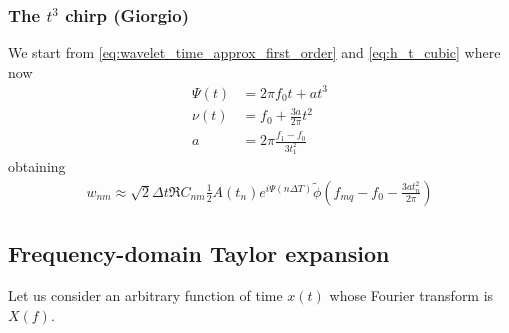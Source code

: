 \documentclass{article}
\begin{document}
\subsubsection{The $t^3$ chirp (Giorgio)}
We start from \eqref{eq:wavelet_time_approx_first_order} and \eqref{eq:h_t_cubic} where now
%
\begin{align}
    \Psi(t) &= 2 \pi f_0 t + a t^{3}\nonumber\\
    \nu(t) &= f_0 + \frac{3 a}{2\pi} t^2\nonumber\\
    a&=2\pi \frac{f_1-f_0}{3t_1^2}
\end{align}
%
obtaining
%
\begin{align}
\label{eq:wavelet_time_approx_first_order_tcube}
w_{n m} \approx \sqrt{2} \Delta t \Re C_{n m} \frac{1}{2} A(t_n) e^{i\Psi(n\Delta T)} \tilde{\phi}\left( f_{mq} - f_0 - \frac{3a t_n^2}{2\pi} \right)
\end{align}

\subsection{Frequency-domain Taylor expansion}

Let us consider an arbitrary function of time $x(t)$ whose Fourier transform is $X(f)$.
\end{document}
